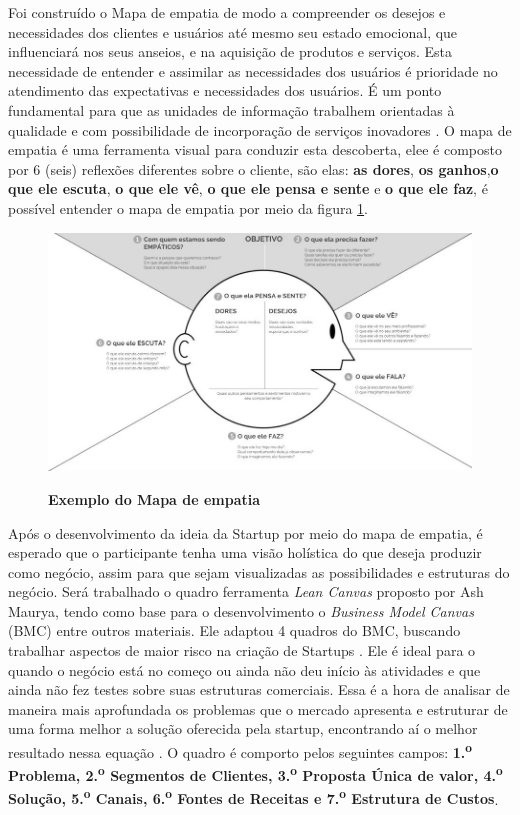 Foi construído o Mapa de empatia de modo a compreender os desejos e necessidades dos clientes e usuários até mesmo seu estado emocional, que influenciará nos seus anseios, e na  aquisição de produtos e serviços. Esta necessidade de entender e assimilar as necessidades dos usuários é prioridade no atendimento das expectativas e necessidades dos usuários. É um ponto fundamental para que as unidades de informação trabalhem orientadas à qualidade e com possibilidade de incorporação de serviços inovadores \cite{valdrich_mapa_2018}. O mapa de empatia é uma ferramenta visual para conduzir esta descoberta, elee é composto por 6 (seis) reflexões diferentes sobre o cliente, são elas: \textbf{as dores}, \textbf{os ganhos},\textbf{o que ele escuta}, \textbf{o que ele vê}, \textbf{o que ele pensa e sente} e  \textbf{o que ele faz}, é possível entender o mapa de empatia por meio da figura \ref{figura_6}. 


\begin{figure}[H]
\centering
\caption{\textbf{Exemplo do Mapa de empatia}}
\includegraphics[scale=0.5]{Imagens/mapa_empatia.jpg}
\label{figura_6}
\end{figure}


Após o desenvolvimento da ideia da Startup por meio do mapa de empatia, é esperado que o participante tenha uma visão holística do que deseja produzir como negócio, assim para que sejam visualizadas as possibilidades e estruturas do negócio. Será trabalhado o quadro ferramenta \textit{Lean Canvas} proposto por Ash Maurya, tendo como base para o desenvolvimento o \textit{Business Model Canvas} (BMC) entre outros materiais. Ele adaptou 4 quadros do BMC, buscando trabalhar aspectos de maior risco na criação de Startups \cite{maurya_running_2012}. Ele é ideal para o quando o negócio está no começo ou ainda não deu início às atividades e que ainda não fez testes sobre suas estruturas comerciais. Essa é a hora de analisar de maneira mais aprofundada os problemas que o mercado apresenta e estruturar de uma forma melhor a solução oferecida pela startup, encontrando aí o melhor resultado nessa equação \cite{sebrae_aprenda_2019}. O quadro é comporto pelos seguintes campos: \textbf{1.\textsuperscript{o} Problema, 2.\textsuperscript{o} Segmentos de Clientes, 3.\textsuperscript{o} Proposta Única de valor, 4.\textsuperscript{o} Solução, 5.\textsuperscript{o} Canais, 6.\textsuperscript{o} Fontes de Receitas e 7.\textsuperscript{o} Estrutura de Custos}. 

